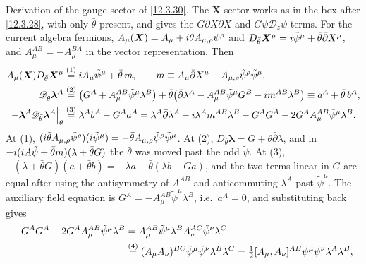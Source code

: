 \begin{tcolorbox}[breakable]
	\begin{remark}
		Derivation of the gauge sector of \eqref{12.3.30}. The $\bm X$ sector works as in the box after \eqref{12.3.28}, with only $\bar\theta$ present, and gives the $G\partial X\bar\partial X$ and $G\tilde\psi\mathscr D_{z}\tilde\psi$ terms. For the current algebra fermions, $A_{\mu}(\bm X)=A_{\mu}+i\bar\theta A_{\mu,\rho}\tilde\psi^{\rho}$ and $D_{\bar\theta}\bm X^{\mu}=i\tilde\psi^{\mu}+\bar\theta\bar\partial X^{\mu}$, and $A_{\mu}^{AB}=-A_{\mu}^{BA}$ in the vector representation. Then
		\begin{align*}
			A_{\mu}(\bm X)D_{\bar\theta}\bm X^{\mu}&\overset{(1)}{=} i A_{\mu}\tilde\psi^{\mu}+\bar\theta\,m,\qquad m\equiv A_{\mu}\bar\partial X^{\mu}-A_{\mu,\rho}\tilde\psi^{\rho}\tilde\psi^{\mu},\\
			\mathscr D_{\bar\theta}\bm\lambda^{A}&\overset{(2)}{=} \bigl(G^{A}+A_{\mu}^{AB}\tilde\psi^{\mu}\lambda^{B}\bigr)
			+\bar\theta\bigl(\bar\partial\lambda^{A}-A_{\mu}^{AB}\tilde\psi^{\mu}G^{B}-i m^{AB}\lambda^{B}\bigr)\equiv a^{A}+\bar\theta\,b^{A},\\
			-\bm\lambda^{A}\mathscr D_{\bar\theta}\bm\lambda^{A}\Big|_{\bar\theta}&\overset{(3)}{=} \lambda^{A}b^{A}-G^{A}a^{A}
			=\lambda^{A}\bar\partial\lambda^{A}-i\lambda^{A}m^{AB}\lambda^{B}-G^{A}G^{A}-2G^{A}A_{\mu}^{AB}\tilde\psi^{\mu}\lambda^{B} .
		\end{align*}
		At (1), $(i\bar\theta A_{\mu,\rho}\tilde\psi^{\rho})(i\tilde\psi^{\mu})=-\bar\theta A_{\mu,\rho}\tilde\psi^{\rho}\tilde\psi^{\mu}$. At (2), $D_{\bar\theta}\bm\lambda=G+\bar\theta\bar\partial\lambda$, and in $-i(i A\tilde\psi+\bar\theta m)(\lambda+\bar\theta G)$ the $\bar\theta$ was moved past the odd $\tilde\psi$. At (3), $-(\lambda+\bar\theta G)(a+\bar\theta b)=-\lambda a+\bar\theta(\lambda b-Ga)$, and the two terms linear in $G$ are equal after using the antisymmetry of $A^{AB}$ and anticommuting $\lambda^{A}$ past $\tilde\psi^{\mu}$. The auxiliary field equation is $G^{A}=-A^{AB}_{\mu}\tilde\psi^{\mu}\lambda^{B}$, i.e.\ $a^{A}=0$, and substituting back gives
		\begin{align*}
			-G^{A}G^{A}-2G^{A}A^{AB}_{\mu}\tilde\psi^{\mu}\lambda^{B}
			&=A^{AB}_{\mu}\tilde\psi^{\mu}\lambda^{B}A^{AC}_{\nu}\tilde\psi^{\nu}\lambda^{C}
			\\&\eqs{4} (A_{\mu}A_{\nu})^{BC}\tilde\psi^{\mu}\tilde\psi^{\nu}\lambda^{B}\lambda^{C}
			=\tfrac12[A_{\mu},A_{\nu}]^{AB}\tilde\psi^{\mu}\tilde\psi^{\nu}\lambda^{A}\lambda^{B},\\

\end{align*}
\end{remark}
\end{tcolorbox}

